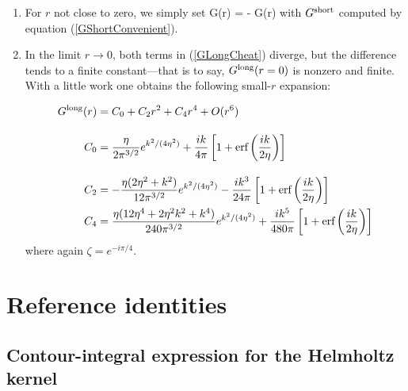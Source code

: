 \documentclass[letterpaper]{article}
\newcommand{\erf}{\text{erf}}
\begin{document}
\begin{enumerate}

\item
For $r$ not close to zero, we simply set
{G(r) =  - G(r)}
with $G^{\hbox{\scriptsize{short}}}$ computed by equation (\ref{GShortConvenient}).

\item
In the limit $r\to 0$, both terms in (\ref{GLongCheat}) 
diverge, but the difference tends to a finite constant---that
is to say, $G^{\hbox{\scriptsize{long}}}(r=0)$ is nonzero and finite. With a little
work one obtains the following small-$r$ expansion:

\begin{align*}
  G\sups{long}(r)
&= C_0 + C_2 r^2 + C_4r^4 + O(r^6)
\\[10pt]
C_0 &= \frac{\eta}{2\pi^{3/2}} e^{k^2/(4\eta^2)}
       + \frac{ik}{4\pi}
         \left[1 + \erf\left( \frac{ik}{2\eta}\right) \right]
\\[10pt]
C_2 &= -\frac{\eta (2\eta^2 + k^2)}{12\pi^{3/2}}
            e^{k^2/(4\eta^2)}
       -\frac{ik^3}{24\pi}
         \left[1 + \erf\left( \frac{ik}{2\eta}\right) \right]
\\
C_4 &= \frac{\eta (12\eta^4 + 2\eta^2 k^2 + k^4)}{240\pi^{3/2}}
            e^{k^2/(4\eta^2)}
       +\frac{ik^5}{480\pi}
         \left[1 + \erf\left( \frac{ik}{2\eta}\right) \right]
\end{align*}
where again $\zeta=e^{-i\pi/4}.$

\end{enumerate}

\newpage
\section{Reference identities}

\subsection*{Contour-integral expression for the Helmholtz kernel}
\label{ContourIntegralSection}
\end{document}
